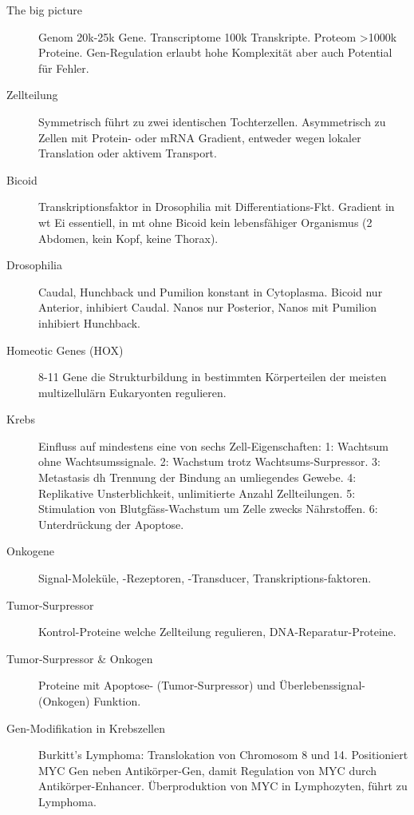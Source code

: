 \documentclass[a4paper,twocolumn,usegeometry,english,fontsize=5,DIV=28]{scrartcl}
\begin{document}
\begin{description}
	\item[The big picture] Genom 20k-25k Gene. Transcriptome 100k
		Transkripte. Proteom >1000k Proteine. Gen-Regulation erlaubt
		hohe Komplexität aber auch Potential für Fehler.
	\item[Zellteilung] Symmetrisch führt zu zwei identischen Tochterzellen.
		Asymmetrisch zu Zellen mit Protein- oder mRNA Gradient,
		entweder wegen lokaler Translation oder aktivem Transport.
	\item[Bicoid] Transkriptionsfaktor in Drosophilia mit
		Differentiations-Fkt. Gradient in wt Ei essentiell, in mt ohne
		Bicoid kein lebensfähiger Organismus (2 Abdomen, kein Kopf,
		keine Thorax).
	\item[Drosophilia] Caudal, Hunchback und Pumilion konstant in
		Cytoplasma. Bicoid nur Anterior, inhibiert Caudal. Nanos nur
		Posterior, Nanos mit Pumilion inhibiert Hunchback.
	\item[Homeotic Genes (HOX)] 8-11 Gene die Strukturbildung in bestimmten
		Körperteilen der meisten multizellulärn Eukaryonten regulieren.
	\item[Krebs] Einfluss auf mindestens eine von sechs Zell-Eigenschaften:
		1: Wachtsum ohne Wachtsumssignale. 2: Wachstum trotz
		Wachtsums-Surpressor. 3: Metastasis dh Trennung der Bindung an
		umliegendes Gewebe. 4: Replikative Unsterblichkeit,
		unlimitierte Anzahl Zellteilungen. 5: Stimulation von
		Blutgfäss-Wachstum um Zelle zwecks Nährstoffen. 6:
		Unterdrückung der Apoptose.
	\item[Onkogene] Signal-Moleküle, -Rezeptoren, -Transducer,
		Transkriptions-faktoren.
	\item[Tumor-Surpressor] Kontrol-Proteine welche Zellteilung regulieren,
		DNA-Reparatur-Proteine.
	\item[Tumor-Surpressor \& Onkogen] Proteine mit Apoptose-
		(Tumor-Surpressor) und Überlebenssignal- (Onkogen) Funktion.
	\item[Gen-Modifikation in Krebszellen] Burkitt's Lymphoma:
		Translokation von Chromosom 8 und 14. Positioniert MYC Gen
		neben Antikörper-Gen, damit Regulation von MYC durch
		Antikörper-Enhancer. Überproduktion von MYC in Lymphozyten,
		führt zu Lymphoma.
\end{description}
\end{document}
